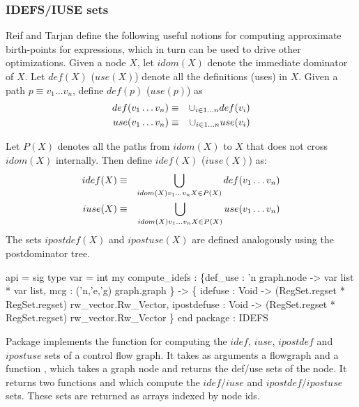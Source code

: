 \subsubsection{IDEFS/IUSE sets}
Reif and Tarjan define the following useful notions for
computing approximate birth-points for expressions,  which in turn
can be used to drive other optimizations.
Given a node $X$, let $idom(X)$ denote the immediate dominator of $X$.
Let $def(X)$ ($use(X)$) denote all the definitions (uses) in $X$. 
Given a path $p \equiv v_1\ldots v_n$, define $def(p)$ ($use(p)$) as
\begin{eqnarray*}
   def(v_1\ldots v_n) & \equiv &\cup_{i \in 1 \ldots n} def(v_i) \\
   use(v_1\ldots v_n) & \equiv &\cup_{i \in 1 \ldots n} use(v_i)
\end{eqnarray*}

Let $P(X)$ denotes all the paths from $idom(X)$ to $X$
that does not cross $idom(X)$ internally.    Then define
$idef(X)$ ($iuse(X)$) as:
\begin{eqnarray*}
  idef(X) & \equiv & \bigcup_{idom(X) v_1 \ldots v_n X \in P(X)} 
     def(v_1\ldots v_n) \\
  iuse(X) & \equiv & \bigcup_{idom(X) v_1 \ldots v_n X \in P(X)} 
     use(v_1\ldots v_n) 
\end{eqnarray*}
The sets $ipostdef(X)$ and $ipostuse(X)$ are defined analogously
using the postdominator tree.

\begin{SML}
 api  = sig
   type var = int
   my compute_idefs : 
       \{def_use : 'n graph.node -> var list * var list,
        mcg     : ('n,'e,'g) graph.graph
       \} ->
       \{ idefuse      : Void -> (RegSet.regset * RegSet.regset) rw_vector.Rw_Vector,
         ipostdefuse  : Void -> (RegSet.regset * RegSet.regset) rw_vector.Rw_Vector
       \}
 end
 package  : IDEFS
\end{SML}
Package  implements the function 
 for computing
the $idef$, $iuse$, $ipostdef$ and $ipostuse$ sets of a control flow
graph.  It takes as arguments a flowgraph and a function , which
takes a graph node and returns the def/use sets of the node.
It returns two functions  and  which
compute the $idef/iuse$ and $ipostdef/ipostuse$ sets.  These sets
are returned as arrays indexed by node ids.
